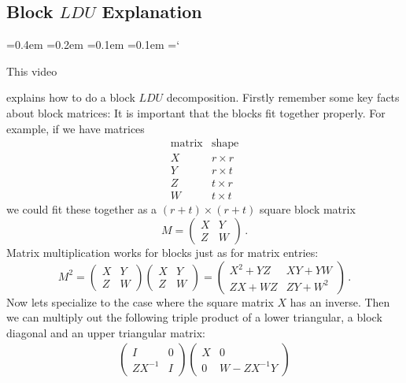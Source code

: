 
\subsection*{Block $LDU$ Explanation}

{\ttfamily
{}\font=0.4em
\font=0.2em
\font=0.1em
\font=0.1em
\hyphenchar\font=`\-


\hypertarget{scripts_lu_decomposition_blocks}{This video} explains how to do a block $LDU$ decomposition.
Firstly remember some key facts about block matrices: It is important that the blocks fit together properly.
For example, if we have matrices
\[
\begin{array}{c|c} \mbox{matrix}&\mbox{shape}\\\hline
X&r\times r\\
Y&r\times t\\
Z&t\times r\\
W& t\times t
\end{array}
\]
we could fit these together as a $(r+t)\times(r+t)$ square block matrix
\[
M=\left(\begin{array}{c|c}X&Y\\\hline Z&W\end{array}\right)\, .
\]
Matrix multiplication works for blocks just as for matrix entries:
\[
M^2 = \left(\begin{array}{c|c}X&Y\\\hline Z&W\end{array}\right)\left(\begin{array}{c|c}X&Y\\\hline Z&W\end{array}\right)
=\left(\begin{array}{c|c}X^2 + YZ&XY+YW\\\hline ZX+WZ&ZY+W^2\end{array}\right)\, .
\]
Now lets specialize to the case where the square matrix $X$ has an inverse. Then we can multiply out the following triple product of a lower triangular, a block diagonal and an
upper triangular matrix:
\begin{gather*}
\left(\begin{array}{c|c}I&0\\\hline ZX^{-1}&I\end{array}\right)\left(\begin{array}{c|c}X&0\\\hline 0&W-ZX^{-1}Y\end{array}\right)

\end{gather*}}
